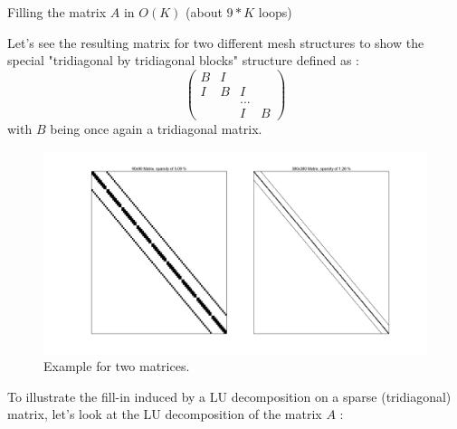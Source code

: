 \documentclass[a4paper]{report}
\begin{document}
\begin{algorithm}[H]
 \caption{Filling the matrix $A$ in $O(K)$ (about $9*K$ loops)}
\end{algorithm}
Let's see the resulting matrix for two different mesh structures to show the special "tridiagonal by tridiagonal blocks" structure defined as :
\[
\left(
\begin{matrix}
B&I&&\\
I&B&I&\\
&&...\\
&&I&B
\end{matrix}
\right)
\]
with $B$ being once again a tridiagonal matrix.
\begin{figure}[H]
\begin{center}
\includegraphics[scale=0.24]{sparsity.png}\caption{Example for two matrices.}
\end{center}
\end{figure}
To illustrate the fill-in induced by a LU decomposition on a sparse (tridiagonal) matrix, let's look at the LU decomposition of the matrix $A$ :
\end{document}
